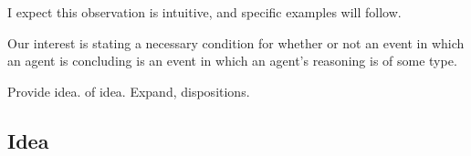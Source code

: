 \begin{note}




\end{note}

\begin{note}
  I expect this observation is intuitive, and specific examples will follow.
\end{note}

\begin{note}
  Our interest is stating a necessary condition for whether or not an event in which an agent is concluding is an event in which an agent's reasoning is of some type.

  Provide idea.
   of idea.
  Expand, dispositions.
\end{note}


\subsection{Idea}
\label{sec:idea}

